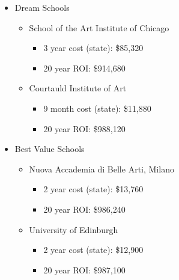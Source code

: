 \begin{itemize}
    \begin{itemize}
        \item{Dream Schools}
            \begin{itemize}
                \item{School of the Art Institute of Chicago}
                    \begin{itemize}
                        \item{3 year cost (state):} \$85,320 
                        \item{20 year ROI:} \$914,680 
                    \end{itemize}
                \item{Courtauld Institute of Art}
                    \begin{itemize}
                        \item{9 month cost (state):} \$11,880
                        \item{20 year ROI:} \$988,120
                    \end{itemize}
            \end{itemize}
        \item{Best Value Schools} 
            \begin{itemize}
                \item{Nuova Accademia di Belle Arti, Milano}
                    \begin{itemize}
                        \item{2 year cost (state):} \$13,760 
                        \item{20 year ROI:} \$986,240 
                    \end{itemize}
                \item{University of Edinburgh}
                    \begin{itemize}
                        \item{2 year cost (state):} \$12,900 
                        \item{20 year ROI:} \$987,100 
                    \end{itemize}
            \end{itemize}
    \end{itemize}
\end{itemize}

